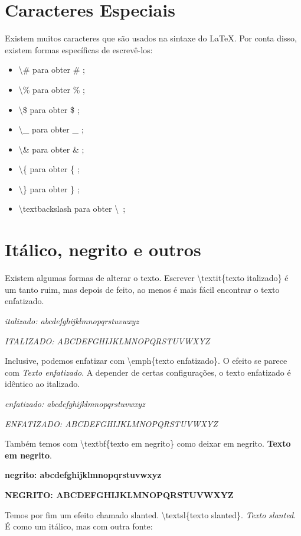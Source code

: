 \section{Caracteres Especiais}
Existem muitos caracteres que são usados na sintaxe do \LaTeX.
Por conta disso, existem formas específicas de escrevê-los:
\begin{itemize}
\item \textbackslash \# para obter \# ;
\item \textbackslash \% para obter \% ;
\item \textbackslash \$ para obter \$ ;
\item \textbackslash \_ para obter \_ ;
\item \textbackslash \& para obter \& ;
\item \textbackslash \{ para obter \{ ;
\item \textbackslash \} para obter \} ;
\item \textbackslash textbackslash para obter \textbackslash\ ;
\end{itemize}

\section{Itálico, negrito e outros}
Existem algumas formas de alterar o texto.
Escrever \textbackslash textit\{texto italizado\} é um tanto ruim,
mas depois de feito, ao menos é mais fácil encontrar o texto enfatizado.

\textit{italizado: abcdefghijklmnopqrstuvwxyz}

\textit{ITALIZADO: ABCDEFGHIJKLMNOPQRSTUVWXYZ}

Inclusive, podemos enfatizar com \textbackslash emph\{texto enfatizado\}.
O efeito se parece com \emph{Texto enfatizado}.
A depender de certas configurações, o texto enfatizado é idêntico ao italizado.

\emph{enfatizado: abcdefghijklmnopqrstuvwxyz}

\emph{ENFATIZADO: ABCDEFGHIJKLMNOPQRSTUVWXYZ}

Também temos com \textbackslash textbf\{texto em negrito\} como deixar em negrito.
\textbf{Texto em negrito}.

\textbf{negrito: abcdefghijklmnopqrstuvwxyz}

\textbf{NEGRITO: ABCDEFGHIJKLMNOPQRSTUVWXYZ}

Temos por fim um efeito chamado slanted. \textbackslash textsl\{texto slanted\}.
\textsl{Texto slanted}. É como um itálico, mas com outra fonte:


